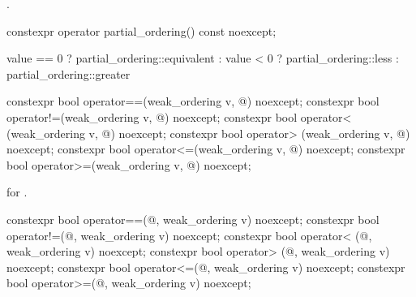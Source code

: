 \begin{itemdescr}
\pnum
\returns
{}.
\end{itemdescr}

%
\begin{itemdecl}
constexpr operator partial_ordering() const noexcept;
\end{itemdecl}

\begin{itemdescr}
\pnum
\returns
\begin{codeblock}
value == 0 ? partial_ordering::equivalent :
value < 0  ? partial_ordering::less :
             partial_ordering::greater
\end{codeblock}
\end{itemdescr}

%
%
%
%
%
%
\begin{itemdecl}
constexpr bool operator==(weak_ordering v, @\unspec@) noexcept;
constexpr bool operator!=(weak_ordering v, @\unspec@) noexcept;
constexpr bool operator< (weak_ordering v, @\unspec@) noexcept;
constexpr bool operator> (weak_ordering v, @\unspec@) noexcept;
constexpr bool operator<=(weak_ordering v, @\unspec@) noexcept;
constexpr bool operator>=(weak_ordering v, @\unspec@) noexcept;
\end{itemdecl}

\begin{itemdescr}
\pnum
\returns
{} for .
\end{itemdescr}

%
%
%
%
%
%
\begin{itemdecl}
constexpr bool operator==(@\unspec@, weak_ordering v) noexcept;
constexpr bool operator!=(@\unspec@, weak_ordering v) noexcept;
constexpr bool operator< (@\unspec@, weak_ordering v) noexcept;
constexpr bool operator> (@\unspec@, weak_ordering v) noexcept;
constexpr bool operator<=(@\unspec@, weak_ordering v) noexcept;
constexpr bool operator>=(@\unspec@, weak_ordering v) noexcept;
\end{itemdecl}

